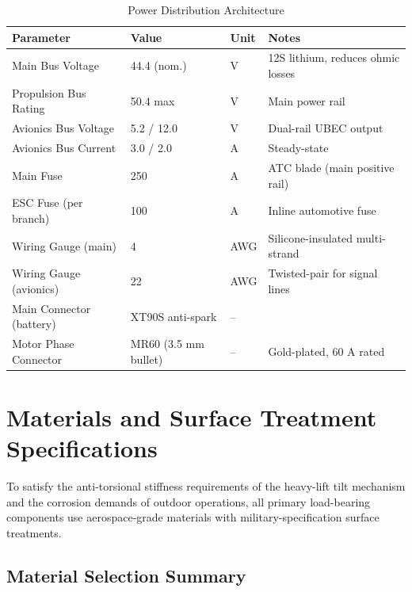 \begin{table}[H]
\centering
\small
\caption{Power Distribution Architecture}
\begin{tabularx}{\textwidth}{L{5cm} C{2.5cm} C{1.8cm} X}
\toprule
\textbf{Parameter} &
\textbf{Value} &
\textbf{Unit} &
\textbf{Notes} \\
\midrule
Main Bus Voltage          & 44.4 (nom.)      & V     & 12S lithium, reduces ohmic losses \\
Propulsion Bus Rating     & 50.4 max         & V     & Main power rail \\
Avionics Bus Voltage      & 5.2 / 12.0       & V     & Dual-rail UBEC output \\
Avionics Bus Current      & 3.0 / 2.0        & A     & Steady-state \\
Main Fuse                 & 250              & A     & ATC blade (main positive rail) \\
ESC Fuse (per branch)     & 100              & A     & Inline automotive fuse \\
Wiring Gauge (main)       & 4                & AWG   & Silicone-insulated multi-strand \\
Wiring Gauge (avionics)   & 22               & AWG   & Twisted-pair for signal lines \\
Main Connector (battery)  & XT90S anti-spark & --    & \\
Motor Phase Connector     & MR60 (3.5 mm bullet) & -- & Gold-plated, 60 A rated \\
\bottomrule
\end{tabularx}
\end{table}

\section{Materials and Surface Treatment Specifications}

To satisfy the anti-torsional stiffness requirements of the heavy-lift tilt mechanism and the corrosion demands of outdoor operations, all primary load-bearing components use aerospace-grade materials with military-specification surface treatments.

\subsection{Material Selection Summary}

